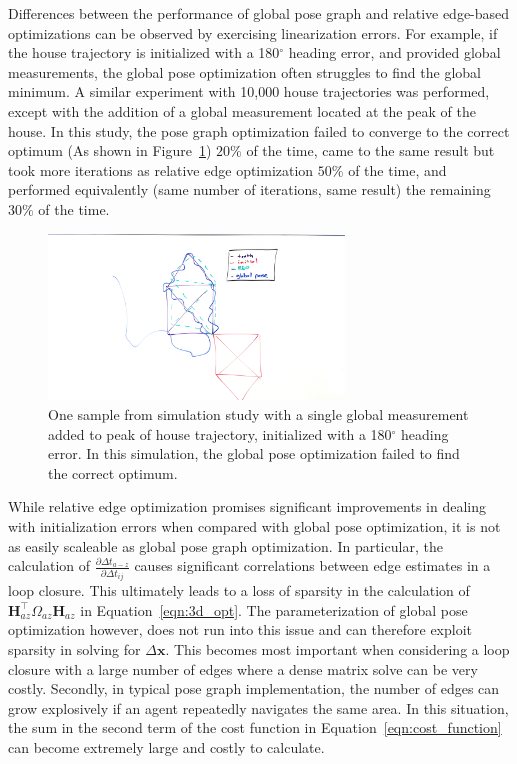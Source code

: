 Differences between the performance of global pose graph and relative edge-based optimizations can be observed by exercising linearization errors.  For example, if the house trajectory is initialized with a 180$^\circ$ heading error, and provided global measurements, the global pose optimization often struggles to find the global minimum.  A similar experiment with 10,000 house trajectories was performed, except with the addition of a global measurement located at the peak of the house.  In this study, the pose graph optimization failed to converge to the correct optimum (As shown in Figure~\ref{fig:g2o_heading_divergence}) $20\%$ of the time, came to the same result but took more iterations as relative edge optimization $50\%$ of the time, and performed equivalently (same number of iterations, same result) the remaining $30\%$ of the time.

\begin{figure}[H]
  \includegraphics[width=0.7\textwidth]{figures/house_g2o_diverged.jpg}
  \caption{One sample from simulation study with a single global measurement added to peak of house trajectory,  initialized with a 180$^\circ$ heading error.  In this simulation, the global pose optimization failed to find the correct optimum.}
  \label{fig:g2o_heading_divergence}
\end{figure}

While relative edge optimization promises significant improvements in dealing with initialization errors when compared with global pose optimization, it is not as easily scaleable as global pose graph optimization.  In particular, the calculation of $\frac {\partial\Delta t_{a-z}}{\partial\Delta t_{ij}}$ causes significant correlations between edge estimates in a loop closure.  This ultimately leads to a loss of sparsity in the calculation of $\mathbf{H}_{az}^\top \Omega_{az} \mathbf{H}_{az}$ in Equation~\ref{eqn:3d_opt}.  The parameterization of global pose optimization however, does not run into this issue and can therefore exploit sparsity in solving for $\Delta \mathbf{x}$.  This becomes most important when considering a loop closure with a large number of edges where a dense matrix solve can be very costly. Secondly, in typical pose graph implementation, the number of edges can grow explosively if an agent repeatedly navigates the same area.  In this situation, the sum in the second term of the cost function in Equation~\ref{eqn:cost_function} can become extremely large and costly to calculate.


